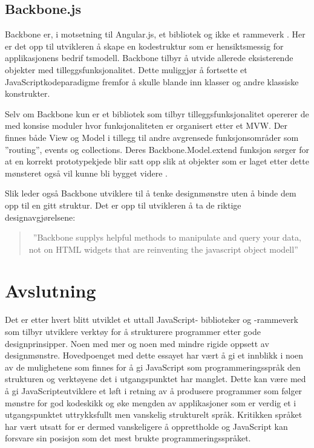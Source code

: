 \documentclass[norsk]{article}
\begin{document}
\subsection{Backbone.js}
Backbone er, i motsetning til Angular.js, et bibliotek og ikke et
rammeverk \parencite{backboneFAQ}. Her er det opp til utvikleren å
skape en kodestruktur som er hensiktsmessig for applikasjonens bedrif
tsmodell. Backbone tilbyr å utvide allerede eksisterende objekter med
tilleggsfunksjonalitet. Dette muliggjør å fortsette et
JavaScriptkodeparadigme fremfor å skulle blande inn klasser og andre
klassiske konstrukter. 

Selv om Backbone kun er et bibliotek som tilbyr tilleggsfunksjonalitet
opererer de med konsise moduler hvor funksjonaliteten er organisert
etter et MVW. Der finnes både View og Model i tillegg til andre
avgrensede funksjonsområder som ”routing”, events og
collections. Deres Backbone.Model.extend funksjon sørger for at en
korrekt prototypekjede blir satt opp slik at objekter som er laget
etter dette mønsteret også vil kunne bli bygget
videre \parencite{backbone}. 

Slik leder også Backbone utviklere til å tenke designmønstre uten å binde dem opp til en gitt struktur. Det er opp til utvikleren å ta de riktige designavgjørelsene: 
\begin{quotation}\
”Backbone supplys helpful methods to manipulate and query your data, not on HTML widgets that are reinventing the javascript object modell” \parencite{backbone}
\end{quotation}
\section{Avslutning}
Det er etter hvert blitt utviklet et uttall JavaScript- biblioteker og -rammeverk som tilbyr utviklere verktøy for å strukturere programmer etter gode designprinsipper. Noen med mer og noen med mindre rigide oppsett av designmønstre. Hovedpoenget med dette essayet har vært å gi et innblikk i noen av de mulighetene som finnes for å gi JavaScript som programmeringsspråk den strukturen og verktøyene det i utgangspunktet har manglet. Dette kan være med å gi JavaScripteutviklere et løft i retning av å produsere programmer som følger mønstre for god kodeskikk og øke mengden av applikasjoner som er verdig et i utgangspunktet uttrykksfullt men vanskelig strukturelt språk. Kritikken språket har vært utsatt for er dermed vanskeligere å opprettholde og JavaScript kan forsvare sin posisjon som det mest brukte programmeringsspråket. 


\newpage
\renewcommand{\refname}{Litteraturliste}


\addcontentsline{toc}{section}{\refname}


\printbibliography
\end{document}
